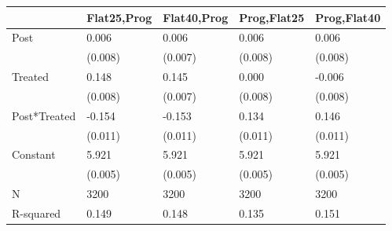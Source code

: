 \begin{tabular}{lllll}
\toprule
 & Flat25,Prog & Flat40,Prog & Prog,Flat25 & Prog,Flat40 \\
\midrule
Post & 0.006 & 0.006 & 0.006 & 0.006 \\
 & (0.008) & (0.007) & (0.008) & (0.008) \\
Treated & 0.148 & 0.145 & 0.000 & -0.006 \\
 & (0.008) & (0.007) & (0.008) & (0.008) \\
Post*Treated & -0.154 & -0.153 & 0.134 & 0.146 \\
 & (0.011) & (0.011) & (0.011) & (0.011) \\
Constant & 5.921 & 5.921 & 5.921 & 5.921 \\
 & (0.005) & (0.005) & (0.005) & (0.005) \\
N & 3200 & 3200 & 3200 & 3200 \\
R-squared & 0.149 & 0.148 & 0.135 & 0.151 \\
\bottomrule
\end{tabular}
